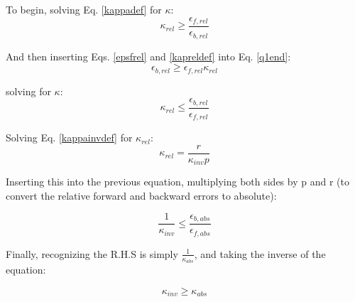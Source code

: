 \documentclass{article}
\begin{document}
To begin, solving Eq. \ref{kappadef} for $\kappa$:
\begin{equation}
    \kappa_{rel} \geq \frac{\epsilon_{f,rel}}{\epsilon_{b,rel}}
\end{equation}

And then inserting Eqs. \ref{epsfrel} and \ref{kapreldef} into Eq. \ref{q1end}:
\begin{equation}
    \epsilon_{b,rel} \geq \epsilon_{f,rel} \kappa_{rel}
\end{equation}

solving for $\kappa$:
\begin{equation}
    \kappa_{rel} \leq \frac{\epsilon_{b,rel}}{\epsilon_{f,rel}}  
\end{equation}

Solving Eq. \ref{kappainvdef} for $\kappa_{rel}$:
\begin{equation}
    \kappa_{rel} = \frac{r}{\kappa_{inv} p}
\end{equation}

Inserting this into the previous equation, multiplying both sides by p and r (to convert the relative forward and backward errors to absolute):

\begin{equation}
    \frac{1}{\kappa_{inv}} \leq \frac{\epsilon_{b,abs}}{\epsilon_{f,abs}}
\end{equation}

Finally, recognizing the R.H.S is simply $\frac{1}{\kappa_{abs}}$, and taking the inverse of the equation:

\begin{equation}
    \kappa_{inv} \geq \kappa_{abs}
\end{equation}
\end{document}
